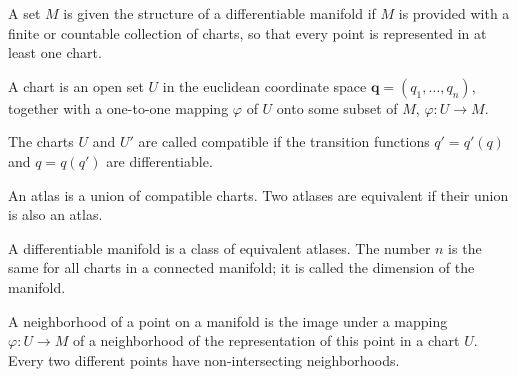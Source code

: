 A set $M$ is given the structure of a differentiable manifold if $M$ is provided with a finite or countable collection of charts, so that every point is represented in at least one chart.

A chart is an open set $U$ in the euclidean coordinate space $\mathbf{q} = (q_1, \ldots, q_n)$, together with a one-to-one mapping $\varphi$ of $U$ onto some subset of $M$, $\varphi: U \to M$.

The charts $U$ and $U'$ are called compatible if the transition functions $q' = q'(q)$ and $q = q(q')$ are differentiable.

An atlas is a union of compatible charts. Two atlases are equivalent if their union is also an atlas.

A differentiable manifold is a class of equivalent atlases. The number $n$ is the same for all charts in a connected manifold; it is called the dimension of the manifold.

A neighborhood of a point on a manifold is the image under a mapping $\varphi: U \to M$ of a neighborhood of the representation of this point in a chart $U$. Every two different points have non-intersecting neighborhoods.
